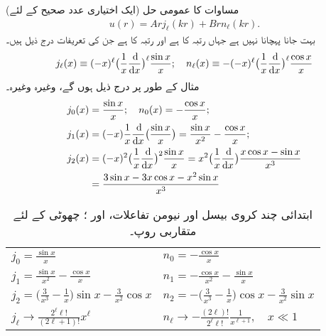 (ایک اختیاری عدد صحیح  کے لئے) مساوات  کا عمومی حل
\begin{align}\label{مساوات_تین_ابعادی_کروی_بیسل_اور_نیومن_حل}
u(r)=Arj_{\ell}(kr)+Brn_{\ell}(kr). 
\end{align}
 بہت جانا پہچانا نہیں ہے جہاں  رتبہ  کا  ہے اور  رتبہ  کا  ہے جن کی تعریفات درج ذیل ہیں۔ 
\begin{align}\label{مساوات_ابعادی_تعریفات_کروی_بیسل_نیومن}
j_{\ell}(x)\equiv(-x)^{\ell}\big(\frac{1}{x}\frac{\dif}{\dif x}\big)^{\ell}\frac{\sin x}{x};\quad n_{\ell}(x)\equiv-(-x)^{\ell}
\big(\frac{1}{x}\frac{\dif}{\dif x}\big)^{\ell}\frac{\cos x}{x}
\end{align}
مثال کے طور پر درج ذیل ہوں گے، وغیرہ وغیرہ۔
\begin{align*}
j_{0}(x)&=\frac{\sin x}{x};\quad n_{0}(x)=-\frac{\cos x}{x};\\
j_1(x)&=(-x)\frac{1}{x}\frac{\dif}{\dif x}\big(\frac{\sin x}{x}\big)=\frac{\sin x}{x^{2}}-\frac{\cos x}{x};\\
j_{2}(x)&=(-x)^{2}\big(\frac{1}{x}\frac{\dif}{\dif x}\big)^{2}\frac{\sin x}{x}=x^{2}\big(\frac{1}{x}\frac{\dif}{\dif x}\big)\frac{x\cos x-\sin x}{x^{3}}\\
&=\frac{3\sin x-3x\cos x-x^2\sin x}{x^{3}}
\end{align*}
\begin{table}
\caption{
ابتدائی چند کروی بیسل اور نیومن تفاعلات،  اور ؛ چھوٹی  کے لئے متقاربی روپ۔
}
\label{جدول_ابعادی_کروی_بیسل_نیومن_تفاعلات}
\centering
\renewcommand{\arraystretch}{2} 
\begin{tabular}{ll}
\toprule
$j_0=\frac{\sin x}{x}$ & $n_0=-\frac{\cos x}{x}$\\
$j_1=\frac{\sin x}{x^2}-\frac{\cos x}{x}$ & $n_1=-\frac{\cos x}{x^2}-\frac{\sin x}{x}$\\
$j_2=\big(\frac{3}{x^3}-\frac{1}{x}\big)\sin x-\frac{3}{x^2}\cos x$ & $n_2=-\big(\frac{3}{x^3}-\frac{1}{x}\big)\cos x-\frac{3}{x^2}\sin x$\\[0.5em]
\midrule
$j_{\ell}\to\frac{2^{\ell} \ell!}{(2\ell+1)!}x^{\ell}$ & $n_{\ell}\to -\frac{(2\ell)!}{2^{\ell}\ell!}\frac{1}{x^{\ell+1}},\quad x\ll 1$\\
\bottomrule
\end{tabular}
\end{table}
